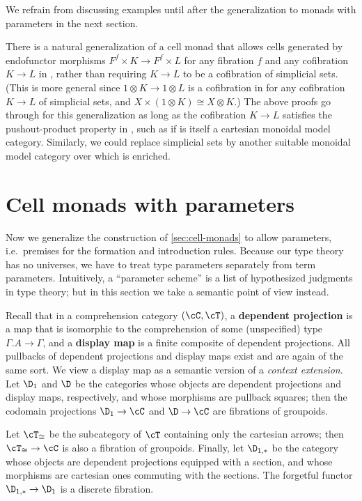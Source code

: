 \documentclass{amsart}
\let\C\cC
\let\T\cT
\begin{document}
We refrain from discussing examples until after the generalization to monads with parameters in the next section.

\begin{rmk}
  There is a natural generalization of a cell monad that allows cells generated by endofunctor morphisms $F^f\times K \to F^f \times L$ for any fibration $f$ and any cofibration $K\to L$ in \sM, rather than requiring $K\to L$ to be a cofibration of simplicial sets.
  (This is more general since $1\otimes K \to 1\otimes L$ is a cofibration in \sM for any cofibration $K\to L$ of simplicial sets, and $X\times (1\otimes K) \cong X\otimes K$.)
  The above proofs go through for this generalization as long as the cofibration $K\to L$ satisfies the pushout-product property in \sM, such as if \sM is itself a cartesian monoidal model category.
  Similarly, we could replace simplicial sets by another suitable monoidal model category over which \sM is enriched.
\end{rmk}


\section{Cell monads with parameters}
\label{sec:cell-monads-param}

Now we generalize the construction of \cref{sec:cell-monads} to allow parameters, i.e.\ premises for the formation and introduction rules.
Because our type theory has no universes, we have to treat type parameters separately from term parameters.
Intuitively, a ``parameter scheme'' is a list of hypothesized judgments in type theory; but in this section we take a semantic point of view instead.

Recall that in a comprehension category $(\C,\T)$, a \textbf{dependent projection} is a map that is isomorphic to the comprehension of some (unspecified) type $\Gamma.A\to\Gamma$, and a \textbf{display map} is a finite composite of dependent projections.
All pullbacks of dependent projections and display maps exist and are again of the same sort.
We view a display map as a semantic version of a \emph{context extension}.
Let $\D_1$ and $\D$ be the categories whose objects are dependent projections and display maps, respectively, and whose morphisms are pullback squares; then the codomain projections $\D_1\to\C$ and $\D\to\C$ are fibrations of groupoids.

Let $\T_{\cong}$ be the subcategory of $\T$ containing only the cartesian arrows; then $\T_{\cong}\to\C$ is also a fibration of groupoids.
Finally, let $\D_{1,*}$ be the category whose objects are dependent projections equipped with a section, and whose morphisms are cartesian ones commuting with the sections.
The forgetful functor $\D_{1,*} \to \D_1$ is a discrete fibration.
\end{document}

